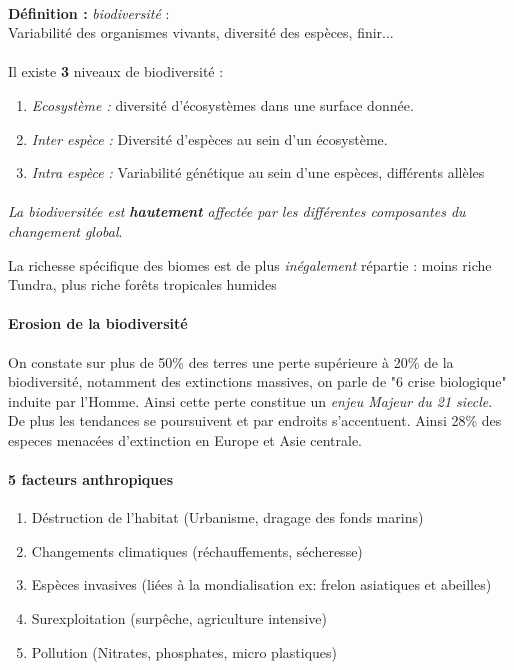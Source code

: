 \documentclass {article}
\begin{document}
\paragraph{}
\textbf{Définition :} \textit{biodiversité} : 
\\ Variabilité des organismes vivants, diversité des espèces, finir...

\paragraph{}
Il existe \textbf{3} niveaux de biodiversité :
\begin{enumerate}
\item \textit{Ecosystème :} diversité d'écosystèmes dans une surface donnée.
\item \textit{Inter espèce :} Diversité d'espèces au sein d'un écosystème.
\item \textit{Intra espèce :} Variabilité génétique au sein d'une espèces, différents allèles
\end{enumerate}

\paragraph{}
\emph{La biodiversitée est \textbf{hautement} affectée par les différentes composantes du changement global}.

La richesse spécifique des biomes est de plus \emph{inégalement} répartie : moins riche Tundra, plus riche forêts tropicales humides

\paragraph{Erosion de la biodiversité}
On constate sur plus de 50\% des terres une perte supérieure à 20\% de la biodiversité, notamment des extinctions massives, on parle de "6 crise biologique" induite par l'Homme.
Ainsi cette perte constitue un \emph{enjeu Majeur du 21 siecle}.
De plus les tendances se poursuivent et par endroits s'accentuent. 
Ainsi 28\% des especes menacées d'extinction en Europe et Asie centrale.

\paragraph{5 facteurs anthropiques}
\begin{enumerate}
\item Déstruction de l'habitat (Urbanisme, dragage des fonds marins)
\item Changements climatiques (réchauffements, sécheresse)
\item Espèces invasives (liées à la mondialisation ex: frelon asiatiques et abeilles)
\item Surexploitation (surpêche, agriculture intensive)
\item Pollution (Nitrates, phosphates, micro plastiques)
\end{enumerate}
\end{document}
